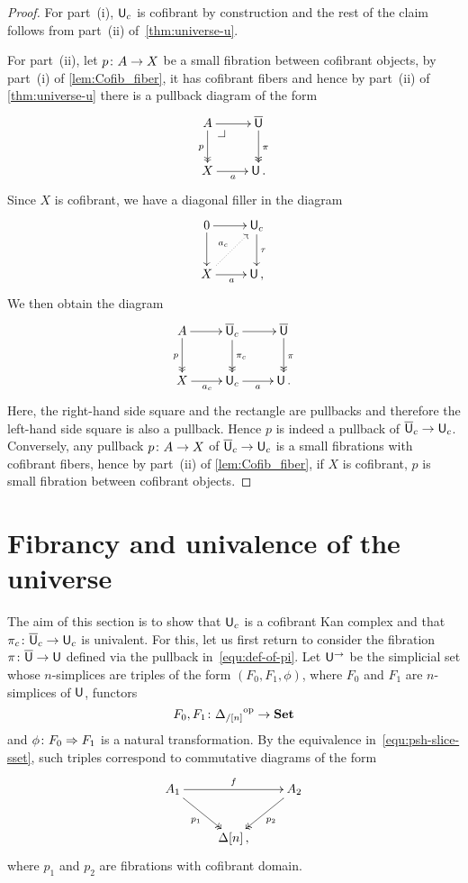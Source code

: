 \documentclass[reqno,10pt,a4paper,oneside,draft]{amsart}
\begin{document}
\begin{proof} For part~(i), $\mathsf{U}_c$ is cofibrant by construction and the rest of the claim follows from part~(ii) of~\cref{thm:universe-u}. 


For part~(ii), let $p \colon A \to X$ be a small fibration between cofibrant objects, by part~(i) of \cref{lem:Cofib_fiber}, it has cofibrant fibers and hence by part~(ii) of \cref{thm:universe-u} there is a pullback diagram of the form 
\[
\xymatrix{
A \ar[r] \ar@{->>}[d]_p \drpullback & \UU \ar@{->>}[d]^{\pi} \\
X \ar[r]_a & \U \, . }
\]
Since $X$ is cofibrant, we have a diagonal filler in the diagram
\[
\xymatrix{
0 \ar[r] \ar[d] & \U_c \ar[d]^{\tau} \\
X \ar[r]_a \ar@{.>}[ur]^{a_c} & \U \, , }
\]
 We then obtain the diagram
\[
\xymatrix{
A \ar[r] \ar@{->>}[d]_p &  \UU_c \ar[r]  \ar@{->>}[d]^{\pi_c}  & \UU \ar@{->>}[d]^{\pi} \\
X \ar[r]_{a_c} & \U_c \ar[r]_{a} &  \U \, . }
\]
Here, the right-hand side square and the rectangle are pullbacks and therefore the left-hand
side square is also a pullback. Hence $p$ is indeed a pullback of $\overline{\mathsf{U}}_c \rightarrow \mathsf{U}_c$. Conversely, any pullback  $p \colon A \rightarrow X$ of $\overline{\mathsf{U}}_c \rightarrow \mathsf{U}_c$ is a small fibrations with cofibrant fibers, hence by part~(ii) of \ref{lem:Cofib_fiber}, if $X$ is cofibrant, $p$ is small fibration between cofibrant objects.
\end{proof} 

\section{Fibrancy and univalence of the universe}
\label{sec:fibrancy-and-univalence}


The aim of this section is to show that $\mathsf{U}_c$ is a cofibrant Kan complex and that $\pi_c \colon
\overline{\mathsf{U}}_c \to \mathsf{U}_c$ is univalent.  For this, let us first return to consider the fibration $\pi \colon \overline{\mathsf{U}} \to \mathsf{U}$ defined
via the pullback in~\eqref{equ:def-of-pi}. Let $\mathsf{U}^{\rightarrow}$ be the simplicial set whose $n$-simplices are triples of the form $(F_0, F_1, \phi)$, where $F_0$ and $F_1$ are $n$-simplices of $\mathsf{U}$, \ie functors
 \[
F_0, F_1 \colon {\Delta_{/[n]}}^{\operatorname{op}} \rightarrow \mathbf{Set}
\]
and $\phi \colon F_0 \Rightarrow F_1$ is a natural transformation. By the equivalence in~\eqref{equ:psh-slice-sset},
such triples correspond to commutative diagrams of the form
\begin{equation}
\label{equ:corresp}
\begin{gathered}
\xymatrix{ 
A_1 \ar[rr]^{f} \ar@{->>}[dr]_{p_1} & & A_2 \ar@{->>}[dl]^{p_2} \\
& \Delta[n] \, , & }
\end{gathered}
\end{equation}
where $p_1$ and $p_2$ are fibrations with cofibrant domain.
\end{document}
